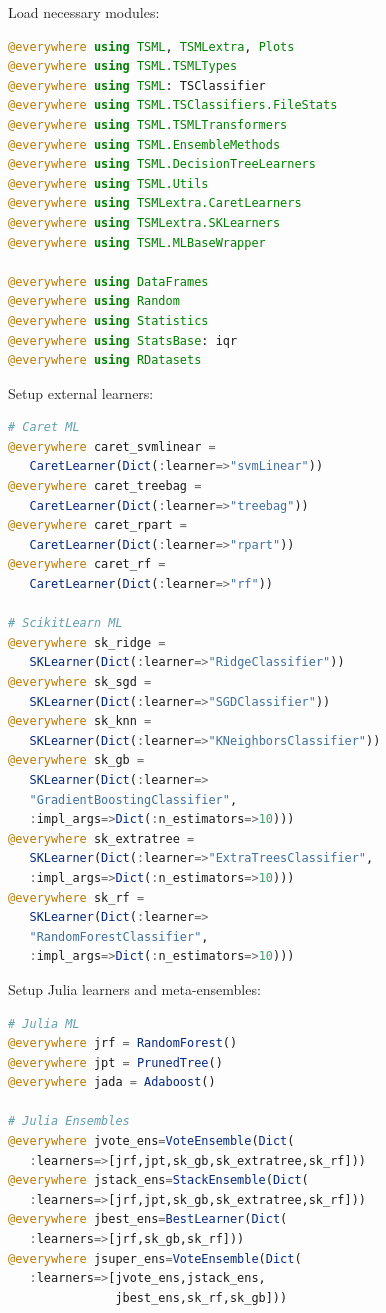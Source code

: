 \documentclass{juliacon}
\begin{document}
\vskip 6pt

Load necessary modules:
\begin{lstlisting}[language = Julia]
@everywhere using TSML, TSMLextra, Plots
@everywhere using TSML.TSMLTypes
@everywhere using TSML: TSClassifier
@everywhere using TSML.TSClassifiers.FileStats
@everywhere using TSML.TSMLTransformers
@everywhere using TSML.EnsembleMethods
@everywhere using TSML.DecisionTreeLearners
@everywhere using TSML.Utils
@everywhere using TSMLextra.CaretLearners
@everywhere using TSMLextra.SKLearners
@everywhere using TSML.MLBaseWrapper

@everywhere using DataFrames
@everywhere using Random
@everywhere using Statistics
@everywhere using StatsBase: iqr
@everywhere using RDatasets
\end{lstlisting}

Setup external learners:
\begin{lstlisting}[language = Julia]
# Caret ML
@everywhere caret_svmlinear = 
   CaretLearner(Dict(:learner=>"svmLinear"))
@everywhere caret_treebag = 
   CaretLearner(Dict(:learner=>"treebag"))
@everywhere caret_rpart = 
   CaretLearner(Dict(:learner=>"rpart"))
@everywhere caret_rf = 
   CaretLearner(Dict(:learner=>"rf"))

# ScikitLearn ML
@everywhere sk_ridge = 
   SKLearner(Dict(:learner=>"RidgeClassifier"))
@everywhere sk_sgd = 
   SKLearner(Dict(:learner=>"SGDClassifier"))
@everywhere sk_knn = 
   SKLearner(Dict(:learner=>"KNeighborsClassifier"))
@everywhere sk_gb = 
   SKLearner(Dict(:learner=>
   "GradientBoostingClassifier",
   :impl_args=>Dict(:n_estimators=>10)))
@everywhere sk_extratree = 
   SKLearner(Dict(:learner=>"ExtraTreesClassifier",
   :impl_args=>Dict(:n_estimators=>10)))
@everywhere sk_rf = 
   SKLearner(Dict(:learner=>
   "RandomForestClassifier",
   :impl_args=>Dict(:n_estimators=>10)))
\end{lstlisting}

Setup Julia learners and meta-ensembles:
\begin{lstlisting}[language = Julia]
# Julia ML
@everywhere jrf = RandomForest()
@everywhere jpt = PrunedTree()
@everywhere jada = Adaboost()

# Julia Ensembles
@everywhere jvote_ens=VoteEnsemble(Dict(
   :learners=>[jrf,jpt,sk_gb,sk_extratree,sk_rf]))
@everywhere jstack_ens=StackEnsemble(Dict(
   :learners=>[jrf,jpt,sk_gb,sk_extratree,sk_rf]))
@everywhere jbest_ens=BestLearner(Dict(
   :learners=>[jrf,sk_gb,sk_rf]))
@everywhere jsuper_ens=VoteEnsemble(Dict(
   :learners=>[jvote_ens,jstack_ens,
               jbest_ens,sk_rf,sk_gb]))
\end{lstlisting}
\end{document}
